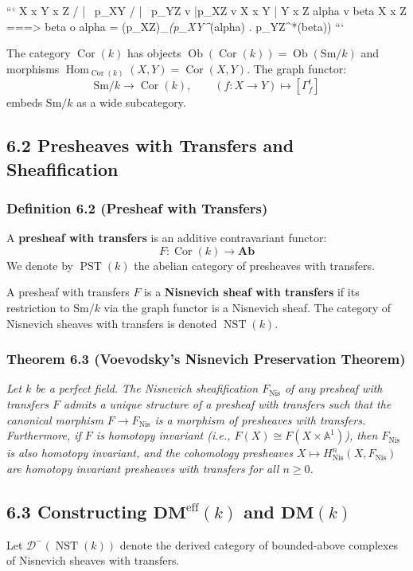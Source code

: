 \documentclass[11pt,twoside,openright]{amsbook}
\begin{document}
{```
                  X x Y x Z
                 /    |    \
           p_XY /     |     \ p_YZ
               v      |p_XZ  v
             X x Y    |    Y x Z
              alpha   v     beta
                     X x Z  ===> beta o alpha = (p_XZ)_\textit{(p_XY^}(alpha) . p_YZ^*(beta))
```

The category $\operatorname{Cor}(k)$ has objects $\operatorname{Ob}(\operatorname{Cor}(k)) = \operatorname{Ob}(\mathrm{Sm}/k)$ and morphisms $\operatorname{Hom}_{\operatorname{Cor}(k)}(X, Y) = \operatorname{Cor}(X, Y)$. The graph functor:
$$\mathrm{Sm}/k \longrightarrow \operatorname{Cor}(k), \qquad (f: X \to Y) \longmapsto [\Gamma_f^t]$$
embeds $\mathrm{Sm}/k$ as a wide subcategory.

\subsection{6.2 Presheaves with Transfers and Sheafification}
\subsubsection{Definition 6.2 (Presheaf with Transfers)}
A \textbf{presheaf with transfers} is an additive contravariant functor:
$$F: \operatorname{Cor}(k) \longrightarrow \mathbf{Ab}$$
We denote by $\operatorname{PST}(k)$ the abelian category of presheaves with transfers.

A presheaf with transfers $F$ is a \textbf{Nisnevich sheaf with transfers} if its restriction to $\mathrm{Sm}/k$ via the graph functor is a Nisnevich sheaf. The category of Nisnevich sheaves with transfers is denoted $\operatorname{NST}(k)$.

\subsubsection{Theorem 6.3 (Voevodsky's Nisnevich Preservation Theorem)}
\textit{Let $k$ be a perfect field. The Nisnevich sheafification $F_{\mathrm{Nis}}$ of any presheaf with transfers $F$ admits a unique structure of a presheaf with transfers such that the canonical morphism $F \to F_{\mathrm{Nis}}$ is a morphism of presheaves with transfers. Furthermore, if $F$ is homotopy invariant (i.e., $F(X) \cong F(X \times \mathbb{A}^1)$), then $F_{\mathrm{Nis}}$ is also homotopy invariant, and the cohomology presheaves $X \mapsto H^n_{\mathrm{Nis}}(X, F_{\mathrm{Nis}})$ are homotopy invariant presheaves with transfers for all $n \ge 0$.}

\subsection{6.3 Constructing $\mathbf{DM}^{\mathrm{eff}}(k)$ and $\mathbf{DM}(k)$}
Let $\mathcal{D}^-(\operatorname{NST}(k))$ denote the derived category of bounded-above complexes of Nisnevich sheaves with transfers.

}
\end{document}
